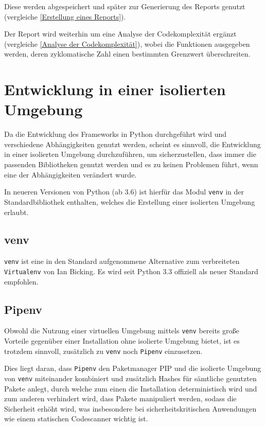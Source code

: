         Diese werden abgespeichert und
        später zur Generierung des Reports genutzt
        (vergleiche
        \vref{Erstellung eines Reports}).

        Der Report wird weiterhin um eine Analyse der Codekomplexität ergänzt
        (vergleiche
        \vref{Analyse der Codekomplexität}),
        wobei die Funktionen ausgegeben werden,
        deren zyklomatische Zahl einen bestimmten Grenzwert überschreiten.

    \section{Entwicklung in einer isolierten Umgebung}
        Da die Entwicklung des Frameworks in Python durchgeführt wird und
        verschiedene Abhängigkeiten genutzt werden,
        scheint es sinnvoll,
        die Entwicklung in einer isolierten Umgebung durchzuführen,
        um sicherzustellen,
        dass immer die passenden Bibliotheken genutzt werden und
        es zu keinen Problemen führt,
        wenn eine der Abhängigkeiten verändert wurde.

        In neueren Versionen von Python
        (ab 3.6) ist hierfür das Modul
        \lstinline{venv} in der Standardbibliothek enthalten,
        welches die Erstellung einer isolierten Umgebung erlaubt.

        \subsection{venv}
            \lstinline{venv} ist eine in den Standard aufgenommene Alternative zum verbreiteten
            \lstinline{Virtualenv} von Ian Bicking.\cite{Bicking2018}
            Es wird seit Python 3.3 offiziell als neuer Standard empfohlen.\cite{PSF2018c}

        \subsection{Pipenv}
            Obwohl die Nutzung einer virtuellen Umgebung mittels
            \lstinline{venv} bereits große Vorteile gegenüber einer Installation ohne isolierte Umgebung bietet,
            ist es trotzdem sinnvoll,
            zusätzlich zu
            \lstinline{venv} noch
            \lstinline{Pipenv} einzusetzen.

            Dies liegt daran,
            dass
            \lstinline{Pipenv} den Paketmanager
            \gls{PIP} und
            die isolierte Umgebung von
            \lstinline{venv} miteinander kombiniert und
            zusätzlich Hashes für sämtliche genutzten Pakete anlegt,
            durch welche zum einen die Installation deterministisch wird und
            zum anderen verhindert wird,
            dass Pakete manipuliert werden,
            sodass die Sicherheit erhöht wird,
            was insbesondere bei sicherheitskritischen Anwendungen wie
            einem statischen Codescanner wichtig ist.\cite{Reitz2018}


